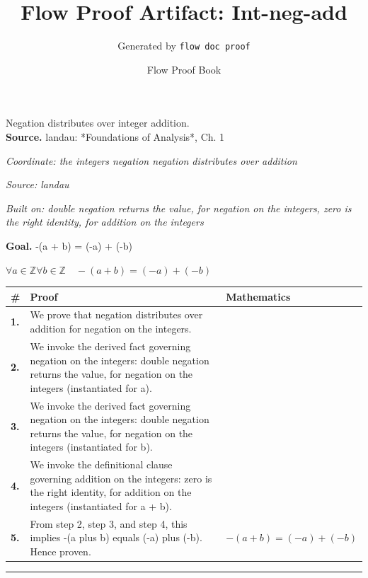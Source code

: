 \documentclass[11pt]{article}
\title{Flow Proof Artifact: Int-neg-add}
\author{Generated by \texttt{flow doc proof}}
\date{Flow Proof Book}
\theoremstyle{definition}
\begin{document}
\maketitle
Negation distributes over integer addition.\\[0.5em]
\textbf{Source.} landau: *Foundations of Analysis*, Ch. 1\\[0.5em]
\bigskip
{}\par
\smallskip\noindent\textit{Coordinate: the integers \cdot negation \cdot negation distributes over addition}\par
\smallskip\noindent\textit{Source: landau}\par
\smallskip\noindent\textit{Built on: double negation returns the value, for negation on the integers, zero is the right identity, for addition on the integers}\par
\medskip
\noindent\textbf{Goal.} -(a + b) = (-a) + (-b)\par
\noindent$\displaystyle \forall a \in \mathbb{Z} \forall b \in \mathbb{Z}\quad -(a + b) = (-a) + (-b)$\par
\medskip
\noindent
\begin{tabular}{@{} >{\raggedright\arraybackslash}p{} >{\raggedright\arraybackslash}p{} >{\raggedleft\arraybackslash}p{} @{}}
\textbf{\#} & \textbf{Proof} & \textbf{Mathematics} \\
\midrule
\textbf{1.} & We prove that negation distributes over addition for negation on the integers. & \\[0.45em]
\textbf{2.} & We invoke the derived fact governing negation on the integers: double negation returns the value, for negation on the integers (instantiated for a). & \\[0.45em]
\textbf{3.} & We invoke the derived fact governing negation on the integers: double negation returns the value, for negation on the integers (instantiated for b). & \\[0.45em]
\textbf{4.} & We invoke the definitional clause governing addition on the integers: zero is the right identity, for addition on the integers (instantiated for a + b). & \\[0.45em]
\textbf{5.} & From step 2, step 3, and step 4, this implies -(a plus b) equals (-a) plus (-b). Hence proven. & $\displaystyle -(a + b) = (-a) + (-b)$ \\[0.45em]
\bottomrule
\end{tabular}
\label{thm:Int-negation-negation_distributes_over_addition}
\par\medskip\hrule
\end{document}
